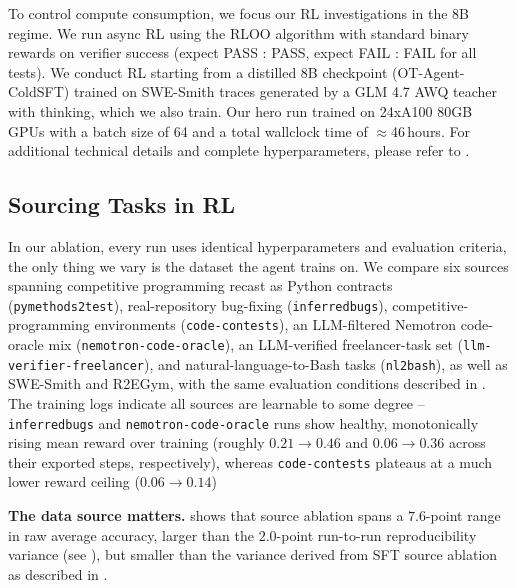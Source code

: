 \documentclass{article}
\begin{document}
To control compute consumption, we focus our RL investigations in the 8B regime. We run async RL using the RLOO algorithm \citep{ahmadian2024back} with standard binary rewards on verifier success (expect PASS : PASS, expect FAIL : FAIL for all tests). We conduct RL starting from a distilled 8B checkpoint (OT-Agent-ColdSFT) trained on SWE-Smith traces generated by a GLM 4.7 AWQ teacher with thinking, which we also train. Our hero run trained on 24xA100 80GB GPUs with a batch size of 64 and a total wallclock time of $\approx$46\,hours. For additional technical details and complete hyperparameters, please refer to .

\subsection{Sourcing Tasks in RL}
\label{sec:rl-data-ablation}



In our ablation, every run uses identical hyperparameters and evaluation criteria, the only thing we vary is the dataset the agent trains on. We compare six sources spanning competitive programming recast as Python contracts (\texttt{pymethods2test}), real-repository bug-fixing (\texttt{inferredbugs}), competitive-programming environments (\texttt{code-contests}), an LLM-filtered Nemotron code-oracle mix (\texttt{nemotron-code-oracle}), an LLM-verified freelancer-task set (\texttt{llm-verifier-freelancer}), and natural-language-to-Bash tasks (\texttt{nl2bash}), as well as SWE-Smith and R2EGym, with the same evaluation conditions described in . The training logs indicate all sources are learnable to some degree -- \texttt{inferredbugs} and \texttt{nemotron-code-oracle} runs show healthy, monotonically rising mean reward over training (roughly $0.21\!\to\!0.46$ and $0.06\!\to\!0.36$ across their exported steps, respectively), whereas \texttt{code-contests} plateaus at a much lower reward ceiling ($0.06\!\to\!0.14$)

\textbf{The data source matters.}  shows that source ablation spans a $7.6$-point range in raw average accuracy, larger than the $2.0$-point run-to-run reproducibility variance (see ), but smaller than the variance derived from SFT source ablation as described in .
\end{document}
